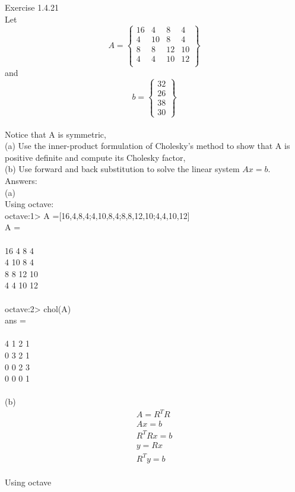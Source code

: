 \documentclass{article}
\begin{document}
	Exercise 1.4.21\\
	Let 
	$$A = \begin{Bmatrix}
	16 & 4 & 8 & 4\\ 
	4 & 10 & 8 & 4\\
	8 & 8 & 12 & 10\\ 
	4 & 4 & 10 & 12\\ 
	\end{Bmatrix}$$	
	and 
	$$b = \begin{Bmatrix}32\\26\\38\\30\end{Bmatrix}$$\\	 
	Notice that A is symmetric,\\
	(a) Use the inner-product formulation of Cholesky's  method to show that A is positive definite and compute its Cholesky factor,\\
	(b) Use forward and back substitution to solve the linear system $Ax = b$.
	\\
	Answers:\\
	(a)\\
	Using octave:\\
	octave:1> A =[16,4,8,4;4,10,8,4;8,8,12,10;4,4,10,12]\\
	A =\\
	\\
	16    4    8    4\\
	4   10    8    4\\
	8    8   12   10\\
	4    4   10   12\\
	\\
	octave:2> chol(A)\\
	ans =\\
	\\
	4   1   2   1\\
	0   3   2   1\\
	0   0   2   3\\
	0   0   0   1\\
	\\
	(b)\\
	\begin{align*}
		A = R^TR\\
		Ax = b\\
		R^TRx=b
		\\
		y = Rx\\
		R^Ty=b
	\end{align*}\\
	Using octave\\
\end{document}
